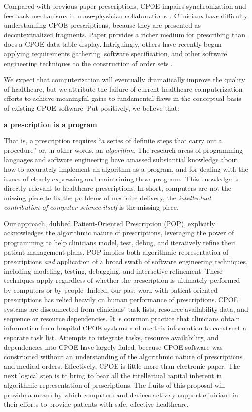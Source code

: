 \documentclass[11pt]{article}
\begin{document}
Compared with previous paper prescriptions, CPOE impairs
synchronization and feedback mechanisms in nurse-physician
collaborations~\citep{Pirnejad2008}.
%
Clinicians have difficulty understanding CPOE prescriptions, because
they are presented as decontextualized fragments.
%
Paper provides a richer medium for prescribing than does a CPOE data
table display.
%
Intriguingly, others have recently begun applying
requirements gathering, software specification, and other software
engineering techniques to the construction of order sets
\citep{health-requirements-engineering}.


We expect that computerization will eventually dramatically improve
the quality of healthcare, but we attribute the failure of current
healthcare computerization efforts to achieve meaningful gains to
fundamental flaws in the conceptual basis of existing CPOE software.
%
Put positively, we believe that:
%
\begin{center}
\textbf{a prescription is a program}
\end{center}
%
That is, a prescription requires ``a series of definite steps that
carry out a procedure'' or, in other words, an \emph{algorithm}.
%
The research areas of programming languages and software engineering
have amassed substantial knowledge about how to accurately implement
an algorithm as a program, and for dealing with the issues of clearly
expressing and maintaining those programs.
%
This knowledge is directly
relevant to healthcare prescriptions.
%
In short, computers are not the missing piece to fix the problems of
medicine delivery, the \emph{intellectual contribution of computer
  science itself} is the missing piece.

Our approach, dubbed Patient-Oriented Prescription (POP), explicitly
acknowledges the algorithmic nature of prescriptions, leveraging the
power of programming to help clinicians model, test, debug, and
iteratively refine their patient management plans.
%
POP implies both algorithmic representation of prescriptions
\emph{and} application of a broad swath of software engineering
techniques, including modeling, testing, debugging, and interactive
refinement.
%
These techniques apply regardless of whether the prescription is
ultimately performed by computers or by people.
%
Indeed, our past work with patient-oriented prescriptions has
relied heavily on human performance of prescriptions.
%
CPOE systems are disconnected from clinicians' task lists, resource
availability data, and sequence or resource dependencies.
%
It is common
practice that clinicians obtain information from hospital CPOE systems
and use this information to construct a separate task list. Attempts
to integrate tasks, resource availability, and dependencies into CPOE
have largely failed, because CPOE software was constructed without an
understanding of the algorithmic nature of prescriptions and medical
orders. Effectively, CPOE is little more than electronic paper.
%
The next logical step is to bring to bear all the intellectual capital
inherent in algorithmic representation of prescriptions.
%
The fruits of this proposal will provide a means by which computers
and devices actively support clinicians in their efforts to provide
patients with safe, effective healthcare.
\end{document}

